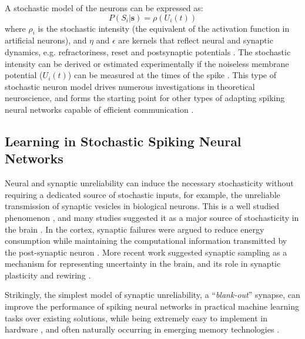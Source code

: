 \documentclass[english]{article}
\renewcommand{\cite}{\citep}
\begin{document}
A stochastic model of the neurons can be expressed as:
\begin{equation}\label{eq:srm_neuron}
  P( S_i | \mathbf{s} ) = \rho(U_i(t)) 
\end{equation}
where $\rho_i$ is the stochastic intensity (the equivalent of the activation function in artificial neurons), and $\eta$ and $\epsilon$ are kernels that reflect neural and synaptic dynamics, e.g. refractoriness, reset and postsynaptic potentials \cite{Gerstner_Kistler02_spikneur}.
The stochastic intensity can be derived or estimated experimentally if the noiseless membrane potential ($U_i(t)$) can be measured at the times of the spike \cite{Jolivet_etal06_predspik}.
This type of stochastic neuron model drives numerous investigations in theoretical neuroscience, and forms the starting point for other types of adapting spiking neural networks capable of efficient communication \cite{Zambrano_Bohte16_fasteffi}.

\subsection{Learning in Stochastic Spiking Neural Networks}
Neural and synaptic unreliability can induce the necessary stochasticity without requiring a dedicated source of stochastic inputs, for example, the unreliable transmission of synaptic vesicles in biological neurons. This is a well studied phenomenon \cite{Katz66_nervmusc,Branco_Staras09_probneur}, and many studies suggested it as a major source of stochasticity in the brain \cite{Faisal_etal08_noisnerv,Abbott_Regehr04_synacomp,Yarom_Hounsgaard11_voltfluc,Moreno-Bote14_poisspik}. 
In the cortex, synaptic failures were argued to reduce energy consumption while maintaining the computational information transmitted by the post-synaptic neuron \cite{Levy_Baxter02_enerneur}.
More recent work suggested synaptic sampling as a mechanism for representing uncertainty in the brain, and its role in synaptic plasticity and rewiring \cite{Kappel_etal15_netwplas}.

Strikingly, the simplest model of synaptic unreliability, a ``\emph{blank-out}'' synapse, can improve the performance of spiking neural networks in practical machine learning tasks over existing solutions, while being extremely easy to implement in hardware \cite{Goldberg_etal01_probsyna}, and often naturally occurring in emerging memory technologies \cite{Saghi_etal15_plasmemr,Al-Shedivat_etal15_inhestoc,Yu_etal13_stoclear}.
\end{document}
